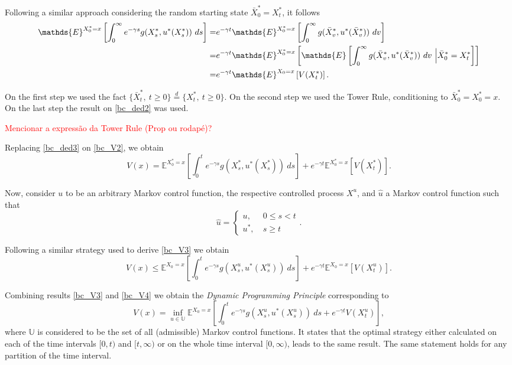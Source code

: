 Following a similar approach considering the random starting state $\bar{X}^*_0=X^*_t$, it follows
\begin{align}
\mathds{E}^{X^*_0=x}\left[ \int^\infty_0 e^{-\gamma s}g(X^*_s,u^*(X^*_s)) \ ds  \right]
=& e^{-\gamma t} \mathds{E}^{X^*_0=x}\left[ \int^\infty_0 g(\bar{X}^*_{v},u^*(\bar{X}^*_{v})) \ dv  \right] \nonumber \\
=& e^{-\gamma t}  \mathds{E}^{X^*_0=x}\left[ \mathds{E}\left[ \int^\infty_0 g(\bar{X}^*_{v},u^*(\bar{X}^*_{v})) \ dv \ \Big{|} \bar{X}^*_0=X^*_t  \right] \right] \nonumber \\
=& e^{-\gamma t}  \mathds{E}^{X_0=x}\left[ V(X_t^*)  \right]. \label{bc_ded3}
\end{align}

On the first step we used the fact $\{ \bar{X}_t^*, \ t\geq 0\}\overset{d}{=} \{ X_t^*, \ t\geq 0\}$. On the second step we used the Tower Rule, conditioning to $\bar{X}^*_0=X^*_0=x$. On the last step the result on \eqref{bc_ded2} was used.

\textcolor{red}{ Mencionar a expressão da Tower Rule (Prop ou rodapé)?} 

Replacing \eqref{bc_ded3} on \eqref{bc_V2}, we obtain
\begin{equation}
 V(x)= \mathds{E}^{X^*_0=x}\left[ \int^t_0 e^{-\gamma s} g(X^*_s,u^*(X^*_s)) \ ds\right] + e^{-\gamma t}  \mathds{E}^{X^*_0=x}\left[ V(X_t^*)  \right].
 \label{bc_V3}
\end{equation}

Now, consider $u$ to be an arbitrary Markov control function, the respective controlled process $X^u$, and $\hat{u}$ a Markov control function such that
$$\hat{u}=\begin{cases}
u, \ &0\leq s <t \\
u^*, \ &s \geq t
\end{cases}.$$

Following a similar strategy used to derive \eqref{bc_V3} we obtain
\begin{equation}
V(x) \leq \mathds{E}^{X_0=x}\left[ \int^t_0 e^{-\gamma s} g(X^u_s,u^*(X^u_s)) \ ds\right] + e^{-\gamma t}  \mathds{E}^{X_0=x}\left[ V(X_t^u)  \right].
\label{bc_V4}
\end{equation}

Combining results \eqref{bc_V3} and \eqref{bc_V4} we obtain the \textit{Dynamic Programming Principle} corresponding to 
\begin{equation}
V(x)=\inf_{u \in \mathds{U}} \mathds{E}^{X_0=x}\left[ \int^t_0 e^{-\gamma s} g(X^u_s,u^*(X^u_s)) \ ds+ e^{-\gamma t} V(X_t^u)  \right],
\label{bc_V5}
\end{equation}
where $\mathds{U}$ is considered to be the set of all (admissible) Markov control functions. It states that the optimal strategy either calculated on each of the time intervals $[0,t)$ and $[t,\infty)$ or on the whole time interval $[0,\infty)$, leads to the same result. The same statement holds for any partition of the time interval.



